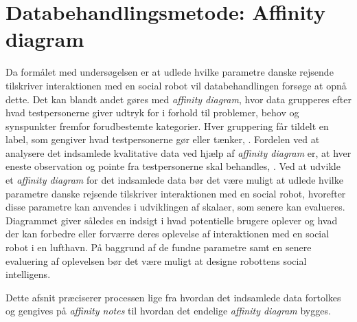 \section{Databehandlingsmetode: Affinity diagram}
\label{ParametreMetodeovervejelserAffinityDiagram}
%
Da formålet med undersøgelsen er at udlede hvilke parametre danske rejsende tilskriver interaktionen med en social robot vil databehandlingen forsøge at opnå dette. Det kan blandt andet gøres med \textit{affinity diagram}, hvor data grupperes efter hvad testpersonerne giver udtryk for i forhold til problemer, behov og synspunkter fremfor forudbestemte kategorier. Hver gruppering får tildelt en label, som gengiver hvad testpersonerne gør eller tænker, \parencite[s. 159]{Book:BuildingAnAffinity}. Fordelen ved at analysere det indsamlede kvalitative data ved hjælp af \textit{affinity diagram} er, at hver eneste observation og pointe fra testpersonerne skal behandles, \parencite[s. 25]{PDF:ConsolidationIdeationAffinity}. Ved at udvikle et \textit{affinity diagram} for det indsamlede data bør det være muligt at udlede hvilke parametre danske rejsende tilskriver interaktionen med en social robot, hvorefter disse parametre kan anvendes i udviklingen af skalaer, som senere kan evalueres. Diagrammet giver således en indsigt i hvad potentielle brugere oplever og hvad der kan forbedre eller forværre deres oplevelse af interaktionen med en social robot i en lufthavn. På baggrund af de fundne parametre samt en senere evaluering af oplevelsen bør det være muligt at designe robottens social intelligens.   

Dette afsnit præciserer processen lige fra hvordan det indsamlede data fortolkes og gengives på \textit{affinity notes} til hvordan det endelige \textit{affinity diagram} bygges.

